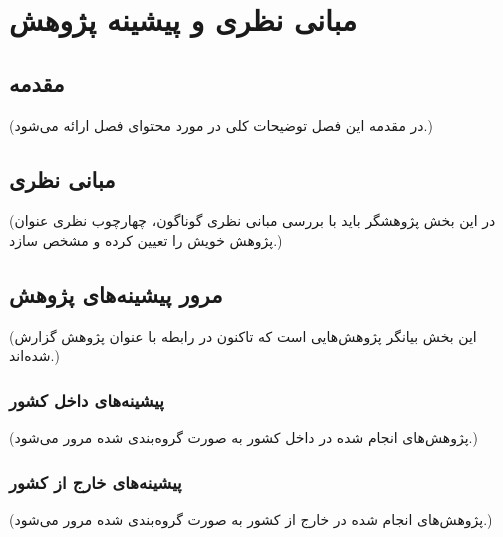 \chapter{مبانی نظری و پیشینه پژوهش}

\section{مقدمه}
(در مقدمه این فصل توضیحات کلی در مورد محتوای فصل ارائه می‌شود.)

\section{مبانی نظری}
(در این بخش پژوهشگر باید با بررسی مبانی نظری گوناگون، چهارچوب نظری عنوان پژوهش خویش را تعیین کرده و مشخص سازد.)

\section{مرور پیشینه‌های پژوهش}
(این بخش بیانگر پژوهش‌هایی است که تاکنون در رابطه با عنوان پژوهش گزارش شده‌اند.)

\subsection{پیشینه‌های داخل کشور}
(پژوهش‌های انجام شده در داخل کشور به صورت گروه‌بندی شده مرور می‌شود.)

\subsection{پیشینه‌های خارج از کشور}
(پژوهش‌های انجام شده در خارج از کشور به صورت گروه‌بندی شده مرور می‌شود.)